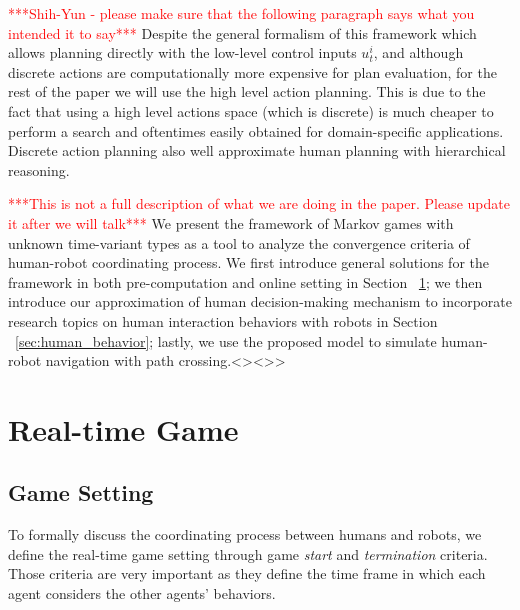 \documentclass[letterpaper, 10 pt, conference]{ieeeconf}  %
\begin{document}
\textcolor{red}{***Shih-Yun - please make sure that the following paragraph says what you intended it to say***} Despite the general formalism of this framework which allows planning directly 
with the low-level control inputs $u^i_t$, and although discrete actions are computationally more expensive for plan evaluation, for the rest of the paper we will use the high level action planning. This is due to the fact that using a high level actions space (which is discrete) is much cheaper to perform a search and oftentimes easily obtained for domain-specific applications. Discrete action planning also well approximate human planning with hierarchical reasoning.  

\textcolor{red}{***This is not a full description of what we are doing in the paper. Please update it after we will talk***} We present the framework of Markov games with unknown time-variant types as a tool to analyze the convergence criteria of human-robot coordinating process. We first introduce general solutions for the framework in both pre-computation and online setting in Section ~\ref{sec:realtime_game}; we then introduce our approximation of human decision-making mechanism to incorporate research topics on human interaction behaviors with robots in Section ~\ref{sec:human_behavior}; lastly, we use the proposed model to simulate human-robot navigation with path crossing.<><>>

\vspace{-.3em}
\section{Real-time Game}\label{sec:realtime_game}
\vspace{-.2em}
\subsection{Game Setting}
To formally discuss the coordinating process between humans and robots, we 
define the real-time game setting through game \textit{start} and \textit{termination} criteria. Those criteria are very important as they define the time frame in which each agent considers the other agents' behaviors.
\end{document}
